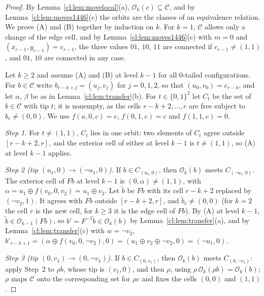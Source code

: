 \begin{proof}
By Lemma~\ref{cl:lem:movelocal}(a), $\mathcal O_k(c)\subseteq\mathcal C$, and by Lemma~\ref{cl:lem:moves1446}(c) the orbits are the classes of an equivalence relation. We prove (A) and (B) together by induction on $k$. For $k=1$, $\mathcal C$ allows only a change of the edge cell, and by Lemma~\ref{cl:lem:moves1446}(c) with $m=0$ and $(x_{r-1},y_{r-1})=c_{r-1}$, the three values $01$, $10$, $11$ are connected if $c_{r-1}\ne(1,1)$, and $01$, $10$ are connected in any case.

Let $k\ge2$ and assume (A) and (B) at level $k-1$ for all $0$-tailed configurations. For $b\in\mathcal C$ write $b_{r-k+j}=(u_j,v_j)$ for $j=0,1,2$, so that $(u_0,v_0)=c_{r-k}$, and let $\alpha$, $\beta$ be as in Lemma~\ref{cl:lem:transfer}(b). For $t\in\{0,1\}^2$ let $C_t$ be the set of $b\in\mathcal C$ with tip $t$; it is nonempty, as the cells $r-k+2,\dots,r$ are free subject to $b_r\ne(0,0)$. We use $f(a,0,c)=c$, $f(0,1,c)=c$ and $f(1,1,c)=0$.

\emph{Step 1.} For $t\ne(1,1)$, $C_t$ lies in one orbit: two elements of $C_t$ agree outside $[r-k+2,r]$, and the exterior cell of either at level $k-1$ is $t\ne(1,1)$, so (A) at level $k-1$ applies.

\emph{Step 2 (tip $(u_1,0)\to(\neg u_1,0)$).} If $b\in C_{(u_1,0)}$, then $\mathcal O_k(b)$ meets $C_{(\neg u_1,0)}$. The exterior cell of $Fb$ at level $k-1$ is $(0,\alpha)\ne(1,1)$, with $\alpha=u_1\oplus f(v_0,0,v_2)=u_1\oplus v_2$. Let $\tilde b$ be $Fb$ with its cell $r-k+2$ replaced by $(\neg v_2,1)$. It agrees with $Fb$ outside $[r-k+2,r]$, and $\tilde b_r\ne(0,0)$ (for $k=2$ the cell $r$ is the new cell, for $k\ge3$ it is the edge cell of $Fb$). By (A) at level $k-1$, $\tilde b\in\mathcal O_{k-1}(Fb)$, so $b'=F^{-1}\tilde b\in\mathcal O_k(b)$ by Lemma~\ref{cl:lem:transfer}(a), and by Lemma~\ref{cl:lem:transfer}(c) with $w=\neg v_2$, $b'_{r-k+1}=(\alpha\oplus f(v_0,0,\neg v_2),0)=(u_1\oplus v_2\oplus\neg v_2,0)=(\neg u_1,0)$.

\emph{Step 3 (tip $(0,v_1)\to(0,\neg v_1)$).} If $b\in C_{(0,v_1)}$, then $\mathcal O_k(b)$ meets $C_{(0,\neg v_1)}$: apply Step~2 to $\rho b$, whose tip is $(v_1,0)$, and then $\rho$, using $\rho\,\mathcal O_k(\rho b)=\mathcal O_k(b)$; $\rho$ maps $\mathcal C$ onto the corresponding set for $\rho c$ and fixes the cells $(0,0)$ and $(1,1)$.


\end{proof}
